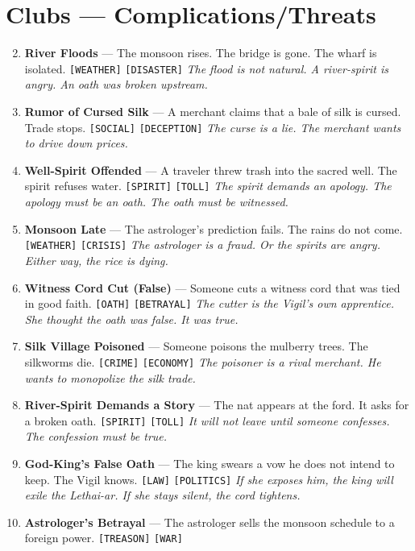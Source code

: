 \section*{Clubs --- Complications/Threats}
\label{sec:ayokha-complications}
\begin{enumerate}
\setcounter{enumi}{1}
\item \textbf{River Floods} --- The monsoon rises. The bridge is gone. The wharf is isolated. \texttt{[WEATHER]} \texttt{[DISASTER]}
  \hfill \textit{The flood is not natural. A river-spirit is angry. An oath was broken upstream.}
\item \textbf{Rumor of Cursed Silk} --- A merchant claims that a bale of silk is cursed. Trade stops. \texttt{[SOCIAL]} \texttt{[DECEPTION]}
  \hfill \textit{The curse is a lie. The merchant wants to drive down prices.}
\item \textbf{Well-Spirit Offended} --- A traveler threw trash into the sacred well. The spirit refuses water. \texttt{[SPIRIT]} \texttt{[TOLL]}
  \hfill \textit{The spirit demands an apology. The apology must be an oath. The oath must be witnessed.}
\item \textbf{Monsoon Late} --- The astrologer's prediction fails. The rains do not come. \texttt{[WEATHER]} \texttt{[CRISIS]}
  \hfill \textit{The astrologer is a fraud. Or the spirits are angry. Either way, the rice is dying.}
\item \textbf{Witness Cord Cut (False)} --- Someone cuts a witness cord that was tied in good faith. \texttt{[OATH]} \texttt{[BETRAYAL]}
  \hfill \textit{The cutter is the Vigil's own apprentice. She thought the oath was false. It was true.}
\item \textbf{Silk Village Poisoned} --- Someone poisons the mulberry trees. The silkworms die. \texttt{[CRIME]} \texttt{[ECONOMY]}
  \hfill \textit{The poisoner is a rival merchant. He wants to monopolize the silk trade.}
\item \textbf{River-Spirit Demands a Story} --- The nat appears at the ford. It asks for a broken oath. \texttt{[SPIRIT]} \texttt{[TOLL]}
  \hfill \textit{It will not leave until someone confesses. The confession must be true.}
\item \textbf{God-King's False Oath} --- The king swears a vow he does not intend to keep. The Vigil knows. \texttt{[LAW]} \texttt{[POLITICS]}
  \hfill \textit{If she exposes him, the king will exile the Lethai-ar. If she stays silent, the cord tightens.}
\item \textbf{Astrologer's Betrayal} --- The astrologer sells the monsoon schedule to a foreign power. \texttt{[TREASON]} \texttt{[WAR]}

\end{enumerate}

